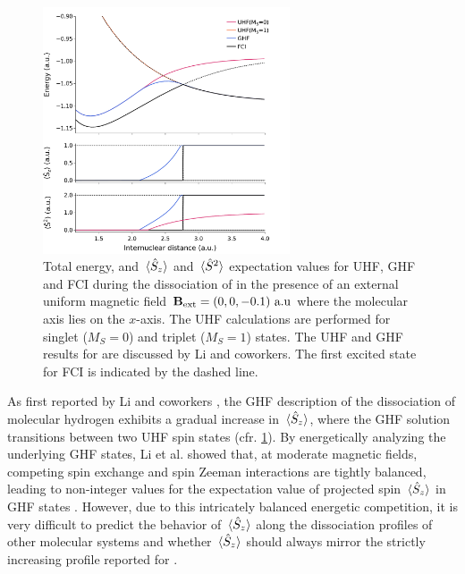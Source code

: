 \documentclass[journal=jctc,manuscript=article]{achemso}
\begin{document}
    \begin{figure}
        \centering
        \includegraphics[width=0.65\textwidth]{FCI-vs-U-GHF-E-and-S(H2)}
        \caption{
            Total energy, and $\ev*{\hat{S}_z}$ and $\ev*{\hat{S}^2}$ expectation values for UHF, GHF and FCI during the dissociation of  in the presence of an external uniform magnetic field $\vb{B}_{\text{ext}}=(0,0,-0.1)\text{ a.u}$ where the molecular axis lies on the $x$-axis.
            The UHF calculations are performed for singlet ($M_S=0$) and triplet ($M_S=1$) states.
            The UHF and GHF results for  are discussed by Li and coworkers.\cite{Sun.2019}
            The first excited state for FCI is indicated by the dashed line.
        }
        \label{fig:FCI(with-excited)-vs-U-GHF-E-and-S(H2)}
    \end{figure}

    As first reported by Li and coworkers \cite{Sun.2019}, the GHF description of the dissociation of molecular hydrogen exhibits a gradual increase in $\ev*{\hat{S}_z}$, where the GHF solution transitions between two UHF spin states (cfr. \cref{fig:FCI(with-excited)-vs-U-GHF-E-and-S(H2)}).
    By energetically analyzing the underlying GHF states, Li et al. showed that, at moderate magnetic fields, competing spin exchange and spin Zeeman interactions are tightly balanced, leading to non-integer values for the expectation value of projected spin $\ev*{\hat{S}_z}$ in GHF states \cite{Sun.2019}.
    However, due to this intricately balanced energetic competition, it is very difficult to predict the behavior of $\ev*{\hat{S}_z}$ along the dissociation profiles of other molecular systems and whether $\ev*{\hat{S}_z}$ should always mirror the strictly increasing profile reported for  \cite{Sun.2019}.
\end{document}
